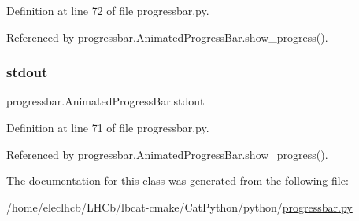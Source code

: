 Definition at line 72 of file progressbar.\+py.



Referenced by progressbar.\+Animated\+Progress\+Bar.\+show\+\_\+progress().

\mbox{\label{classprogressbar_1_1AnimatedProgressBar_aa4bc611ade566c28f1c54e5608a2a200}} 
\subsubsection{\texorpdfstring{stdout}{stdout}}
{\footnotesize\ttfamily progressbar.\+Animated\+Progress\+Bar.\+stdout}



Definition at line 71 of file progressbar.\+py.



Referenced by progressbar.\+Animated\+Progress\+Bar.\+show\+\_\+progress().



The documentation for this class was generated from the following file\+:\begin{DoxyCompactItemize}
\item 
/home/eleclhcb/\+L\+H\+Cb/lbcat-\/cmake/\+Cat\+Python/python/\hyperlink{progressbar_8py}{progressbar.\+py}\end{DoxyCompactItemize}
